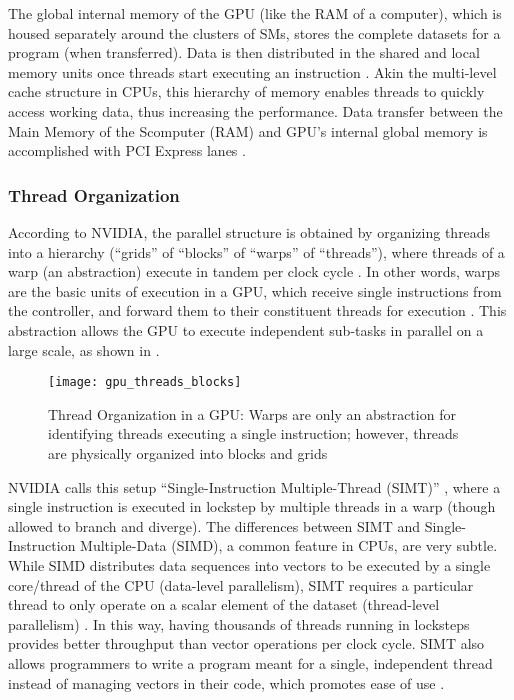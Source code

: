 The global internal memory of the GPU (like the RAM of a computer), which is housed separately around the clusters of SMs, stores the complete datasets for a program (when transferred). Data is then distributed in the shared and local memory units once threads start executing an instruction \cite[Appendix~B]{PattersonARM}. Akin the multi-level cache structure in CPUs, this hierarchy of memory enables threads to quickly access working data, thus increasing the performance. Data transfer between the Main Memory of the Scomputer (RAM) and GPU's internal global memory is accomplished with PCI Express lanes \cite{PascalWhitepaper,ParallelNVIDIA}.

\subsubsection{Thread Organization}
According to NVIDIA, the parallel structure is obtained by organizing threads into a hierarchy (``grids'' of ``blocks'' of ``warps'' of ``threads''), where threads of a warp (an abstraction) execute in tandem per clock cycle \cite{CUDADocs,PattersonARM,wong2010demystifying}. In other words, warps are the basic units of execution in a GPU, which receive single instructions from the controller, and forward them to their constituent threads for execution \cite{CUDADocs,wong2010demystifying}. This abstraction allows the GPU to execute independent sub-tasks in parallel on a large scale, as shown in .
\begin{figure}[!htbp]
    \centering
    \texttt{[image: gpu\_threads\_blocks]}
    \caption[Thread Organization in a GPU]{Thread Organization in a GPU: Warps are only an abstraction for identifying threads executing a single instruction; however, threads are physically organized into blocks and grids \cite{CUDADocs,ParallelNVIDIA}}
    \label{fig:GPU - Thread Organization in a GPU}
\end{figure}

NVIDIA calls this setup ``Single-Instruction Multiple-Thread (SIMT)'' \cite{CUDADocs}, where a single instruction is executed in lockstep by multiple threads in a warp (though allowed to branch and diverge). The differences between SIMT and Single-Instruction Multiple-Data (SIMD), a common feature in CPUs, are very subtle. While SIMD distributes data sequences into vectors to be executed by a single core/thread of the CPU (data-level parallelism), SIMT requires a particular thread to only operate on a scalar element of the dataset (thread-level parallelism) \cite{PattersonARM}. In this way, having thousands of threads running in locksteps provides better throughput than vector operations per clock cycle. SIMT also allows programmers to write a program meant for a single, independent thread instead of managing vectors in their code, which promotes ease of use \cite[Chapter~4]{CUDADocs}.

